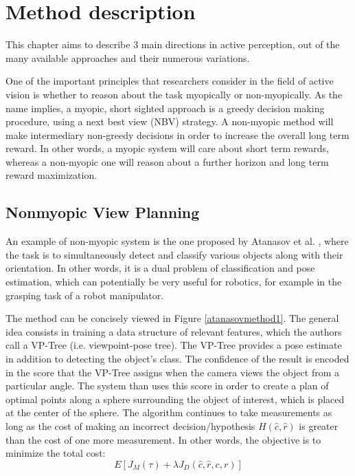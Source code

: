 \documentclass[a4paper,11pt,english]{article}
\begin{document}
\section{Method description}
This chapter aims to describe 3 main directions in active perception, out of the many available approaches and their numerous variations. 

One of the important principles that researchers consider in the field of active vision is whether to reason about the task myopically or non-myopically. As the name implies, a myopic, short sighted approach is a greedy decision making procedure, using a next best view (NBV) strategy. A non-myopic method will make intermediary non-greedy decisions in order to increase the overall long term reward. In other words, a myopic system will care about short term rewards, whereas a non-myopic one will reason about a further horizon and long term reward maximization.  

\subsection{Nonmyopic View Planning}

An example of non-myopic system is the one proposed by Atanasov et al. \cite{atanasov2014nonmyopic}, where the task is to simultaneously detect and classify various objects along with their orientation. In other words, it is a dual problem of classification and pose estimation, which can potentially be very useful for robotics, for example in the grasping task of a robot manipulator. 

The method can be concisely viewed in Figure \ref{atanasovmethod1}. The general idea consists in training a data structure of relevant features, which the authors call a VP-Tree (i.e. viewpoint-pose tree). The VP-Tree provides a pose estimate in addition to detecting the object's class. The confidence of the result is encoded in the score that the VP-Tree assigns when the camera views the object from a particular angle. The system than uses this score in order to create a plan of optimal points along a sphere surrounding the object of interest, which is placed at the center of the sphere. The algorithm continues to take measurements as long as the cost of making an incorrect decision/hypothesis $H(\hat{c}, \hat{r})$ is greater than the cost of one more measurement. In other words, the objective is to minimize the total cost:
\begin{equation}
E[J_M(\tau) + \lambda J_D(\hat{c},\hat{r},c,r)]
\end{equation}
\end{document}
